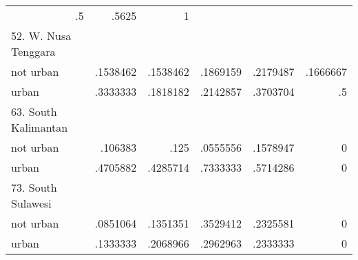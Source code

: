 \begin{table}[!h]
\begin{tabular}{llllll}
  \multicolumn{1}{r}{.5} &
  \multicolumn{1}{r}{.5625} &
  \multicolumn{1}{r}{1} \\
\multicolumn{1}{l}{52. W. Nusa Tenggara} &
  \multicolumn{1}{|r}{} &
  \multicolumn{1}{r}{} &
  \multicolumn{1}{r}{} &
  \multicolumn{1}{r}{} &
  \multicolumn{1}{r}{} \\
\multicolumn{1}{l}{\hspace{1em}not urban} &
  \multicolumn{1}{|r}{.1538462} &
  \multicolumn{1}{r}{.1538462} &
  \multicolumn{1}{r}{.1869159} &
  \multicolumn{1}{r}{.2179487} &
  \multicolumn{1}{r}{.1666667} \\
\multicolumn{1}{l}{\hspace{1em}urban} &
  \multicolumn{1}{|r}{.3333333} &
  \multicolumn{1}{r}{.1818182} &
  \multicolumn{1}{r}{.2142857} &
  \multicolumn{1}{r}{.3703704} &
  \multicolumn{1}{r}{.5} \\
\multicolumn{1}{l}{63. South Kalimantan} &
  \multicolumn{1}{|r}{} &
  \multicolumn{1}{r}{} &
  \multicolumn{1}{r}{} &
  \multicolumn{1}{r}{} &
  \multicolumn{1}{r}{} \\
\multicolumn{1}{l}{\hspace{1em}not urban} &
  \multicolumn{1}{|r}{.106383} &
  \multicolumn{1}{r}{.125} &
  \multicolumn{1}{r}{.0555556} &
  \multicolumn{1}{r}{.1578947} &
  \multicolumn{1}{r}{0} \\
\multicolumn{1}{l}{\hspace{1em}urban} &
  \multicolumn{1}{|r}{.4705882} &
  \multicolumn{1}{r}{.4285714} &
  \multicolumn{1}{r}{.7333333} &
  \multicolumn{1}{r}{.5714286} &
  \multicolumn{1}{r}{0} \\
\multicolumn{1}{l}{73. South Sulawesi} &
  \multicolumn{1}{|r}{} &
  \multicolumn{1}{r}{} &
  \multicolumn{1}{r}{} &
  \multicolumn{1}{r}{} &
  \multicolumn{1}{r}{} \\
\multicolumn{1}{l}{\hspace{1em}not urban} &
  \multicolumn{1}{|r}{.0851064} &
  \multicolumn{1}{r}{.1351351} &
  \multicolumn{1}{r}{.3529412} &
  \multicolumn{1}{r}{.2325581} &
  \multicolumn{1}{r}{0} \\
\multicolumn{1}{l}{\hspace{1em}urban} &
  \multicolumn{1}{|r}{.1333333} &
  \multicolumn{1}{r}{.2068966} &
  \multicolumn{1}{r}{.2962963} &
  \multicolumn{1}{r}{.2333333} &
  \multicolumn{1}{r}{0} \\
\cline{1-6}
\end{tabular}
\end{table}
